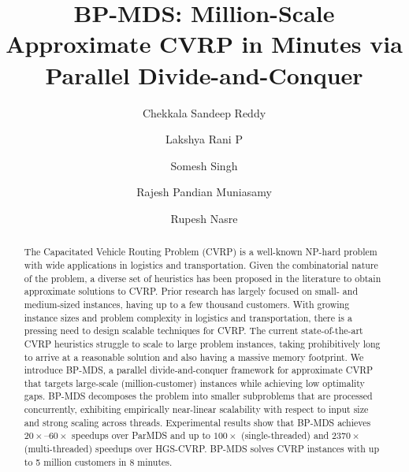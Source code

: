 \documentclass[sigconf]{acmart}
\begin{document}
\title{BP-MDS: Million-Scale Approximate CVRP in Minutes via Parallel Divide-and-Conquer}

\author{Chekkala Sandeep Reddy}

\author{Lakshya Rani P}

\author{Somesh Singh}

\author{Rajesh Pandian Muniasamy}

\author{Rupesh Nasre}


\begin{abstract}
The Capacitated Vehicle Routing Problem (CVRP) is a well-known NP-hard problem with wide applications in logistics and transportation.  Given the combinatorial nature of the problem, a diverse set of heuristics has been proposed in the literature to obtain approximate solutions to CVRP. Prior research has largely focused on small- and medium-sized instances, having up to a few thousand customers. With growing instance sizes and problem complexity in logistics and transportation, there is a pressing need to design scalable techniques for CVRP. The current state-of-the-art CVRP heuristics struggle to scale to large problem instances, taking prohibitively long to arrive at a reasonable solution and also having a massive memory footprint. We introduce BP-MDS, a parallel divide-and-conquer framework for approximate CVRP that targets large-scale (million-customer) instances while achieving low optimality gaps. BP-MDS decomposes the problem into smaller subproblems that are processed concurrently, exhibiting empirically near-linear scalability with respect to input size and strong scaling across threads. Experimental results show that BP-MDS achieves $20\times$--$60\times$ speedups over ParMDS and up to $100\times$ (single-threaded) and $2370\times$ (multi-threaded) speedups over HGS-CVRP. BP-MDS solves CVRP instances with up to 5 million customers in 8 minutes.
\end{abstract} 
\end{document}

